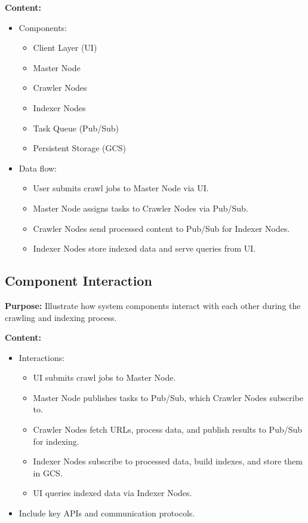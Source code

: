 \documentclass[12pt,a4paper]{report}
\begin{document}
\textbf{Content:}
\begin{itemize}
\item Components:
\begin{itemize}
    \item Client Layer (UI)
    \item Master Node
    \item Crawler Nodes
    \item Indexer Nodes
    \item Task Queue (Pub/Sub)
    \item Persistent Storage (GCS)
\end{itemize}
\item Data flow:
\begin{itemize}
    \item User submits crawl jobs to Master Node via UI.
    \item Master Node assigns tasks to Crawler Nodes via Pub/Sub.
    \item Crawler Nodes send processed content to Pub/Sub for Indexer Nodes.
    \item Indexer Nodes store indexed data and serve queries from UI.
\end{itemize}
\end{itemize}

\subsection{Component Interaction}
\textbf{Purpose:} Illustrate how system components interact with each other during the crawling and indexing process.

\textbf{Content:}
\begin{itemize}
\item Interactions:
\begin{itemize}
    \item UI submits crawl jobs to Master Node.
    \item Master Node publishes tasks to Pub/Sub, which Crawler Nodes subscribe to.
    \item Crawler Nodes fetch URLs, process data, and publish results to Pub/Sub for indexing.
    \item Indexer Nodes subscribe to processed data, build indexes, and store them in GCS.
    \item UI queries indexed data via Indexer Nodes.
\end{itemize}
\item Include key APIs and communication protocols.
\end{itemize}
\end{document}

